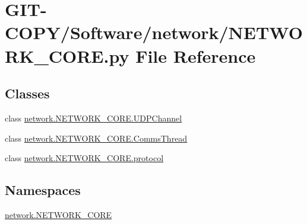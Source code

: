 \hypertarget{GIT-COPY_2Software_2network_2NETWORK__CORE_8py}{}\section{G\+I\+T-\/\+C\+O\+P\+Y/\+Software/network/\+N\+E\+T\+W\+O\+R\+K\+\_\+\+C\+O\+R\+E.py File Reference}
\label{GIT-COPY_2Software_2network_2NETWORK__CORE_8py}
\subsection*{Classes}
\begin{DoxyCompactItemize}
\item 
class \hyperlink{classnetwork_1_1NETWORK__CORE_1_1UDPChannel}{network.\+N\+E\+T\+W\+O\+R\+K\+\_\+\+C\+O\+R\+E.\+U\+D\+P\+Channel}
\item 
class \hyperlink{classnetwork_1_1NETWORK__CORE_1_1CommsThread}{network.\+N\+E\+T\+W\+O\+R\+K\+\_\+\+C\+O\+R\+E.\+Comms\+Thread}
\item 
class \hyperlink{classnetwork_1_1NETWORK__CORE_1_1protocol}{network.\+N\+E\+T\+W\+O\+R\+K\+\_\+\+C\+O\+R\+E.\+protocol}
\end{DoxyCompactItemize}
\subsection*{Namespaces}
\begin{DoxyCompactItemize}
\item 
 \hyperlink{namespacenetwork_1_1NETWORK__CORE}{network.\+N\+E\+T\+W\+O\+R\+K\+\_\+\+C\+O\+R\+E}
\end{DoxyCompactItemize}
